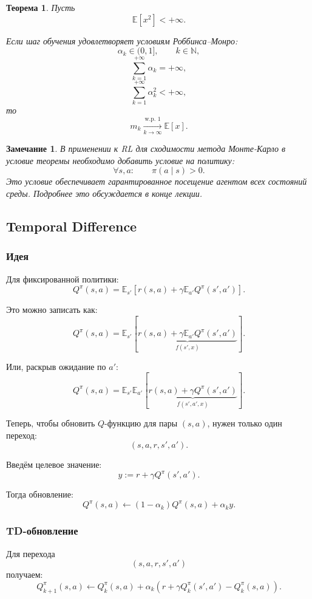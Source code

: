 \documentclass[12pt,a4paper]{article}
\newtheorem{theorem}{Теорема}
\newtheorem{remark}{Замечание}
\begin{document}
\begin{theorem}
Пусть
\[
\mathbb E[x^2] < +\infty.
\]

Если шаг обучения удовлетворяет условиям Роббинса--Монро:
\[
\alpha_k \in (0,1],
\qquad
k \in \mathbb N,
\]
\[
\sum_{k=1}^{+\infty}
\alpha_k
=
+\infty,
\]
\[
\sum_{k=1}^{+\infty}
\alpha_k^2
<
+\infty,
\]
то
\[
m_k
\xrightarrow[k\to\infty]{\text{w.p. }1}
\mathbb E[x].
\]
\end{theorem}

\begin{remark}
В применении к RL для сходимости метода Монте-Карло в условие теоремы необходимо добавить условие на политику:
\[
\forall s,a:
\qquad
\pi(a\mid s)>0.
\]
Это условие обеспечивает гарантированное посещение агентом всех состояний среды. Подробнее это обсуждается в конце лекции.
\end{remark}

\subsection{Temporal Difference}

\subsubsection{Идея}

Для фиксированной политики:
\[
Q^\pi(s,a)
=
\mathbb E_{s'}
\left[
r(s,a)
+
\gamma
\mathbb E_{a'}
Q^\pi(s',a')
\right].
\]

Это можно записать как:
\[
Q^\pi(s,a)
=
\mathbb E_{s'}
\left[
\underbrace{
r(s,a)
+
\gamma
\mathbb E_{a'}
Q^\pi(s',a')
}_{f(s',x)}
\right].
\]

Или, раскрыв ожидание по $a'$:
\[
Q^\pi(s,a)
=
\mathbb E_{s'}
\mathbb E_{a'}
\left[
\underbrace{
r(s,a)
+
\gamma
Q^\pi(s',a')
}_{f(s',a',x)}
\right].
\]

Теперь, чтобы обновить $Q$-функцию для пары $(s,a)$, нужен только один переход:
\[
(s,a,r,s',a').
\]

Введём целевое значение:
\[
y
:=
r+\gamma Q^\pi(s',a').
\]

Тогда обновление:
\[
Q^\pi(s,a)
\leftarrow
(1-\alpha_k)Q^\pi(s,a)
+
\alpha_k y.
\]

\subsubsection{TD-обновление}

Для перехода
\[
(s,a,r,s',a')
\]
получаем:
\[
Q_{k+1}^\pi(s,a)
\leftarrow
Q_k^\pi(s,a)
+
\alpha_k
\left(
r
+
\gamma Q_k^\pi(s',a')
-
Q_k^\pi(s,a)
\right).
\]
\end{document}
